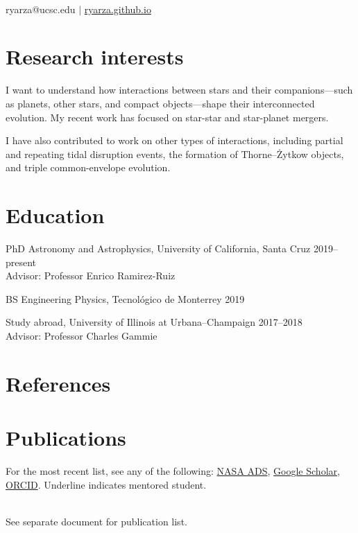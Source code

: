 \documentclass[12pt]{article}
\begin{document}
{\\\vspace{0.5em}
ryarza@ucsc.edu \(|\) \href{https://ryarza.github.io}{ryarza.github.io}

}

\ifdefined\withresearchinterests{}
\section*{Research interests}
I want to understand how interactions between stars and their companions---such as planets, other stars, and compact objects---shape their interconnected evolution. My recent work has focused on star-star and star-planet mergers.

I have also contributed to work on other types of interactions, including partial and repeating tidal disruption events, the formation of Thorne--\.{Z}ytkow objects, and triple common-envelope evolution.
\else\fi

\section*{Education}
PhD Astronomy and Astrophysics, University of California, Santa Cruz \hfill 2019--present\\
Advisor: Professor Enrico Ramirez-Ruiz

BS Engineering Physics, Tecnol\'{o}gico de Monterrey \hfill 2019

Study abroad, University of Illinois at Urbana--Champaign \hfill 2017--2018\\%
Advisor: Professor Charles Gammie

\ifdefined\withreferences{}
\section*{References}

\else\fi

\section*{Publications}
For the most recent list, see any of the following: \href{\adslibrary}{NASA ADS}, \href{\googlescholar}{Google Scholar}, \href{https://orcid.org/0000-0003-0381-1039}{ORCID}.
\ifdefined\withpapers{}
Underline indicates mentored student.


\else
\\See separate document for publication list.
\fi
\end{document}
